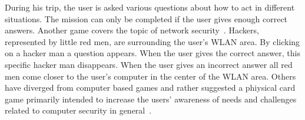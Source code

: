 During his trip, the user is asked various questions about how to act in different situations. 
The mission can only be completed if the user gives enough correct answers.
Another game covers the topic of network security~\cite{wirelesshackers}. 
Hackers, represented by little red men, are surrounding the user's WLAN area. 
By clicking on a hacker man a question appears. 
When the user gives the correct answer, this specific hacker man disappears. 
When the user gives an incorrect answer all red men come closer to the user's computer in the center of the WLAN area.
Others have diverged from computer based games and rather suggested a phiysical card game primarily intended to increase the users' awareness of needs and challenges related to computer security in general~\cite{denning2013controlalthack}.






 

